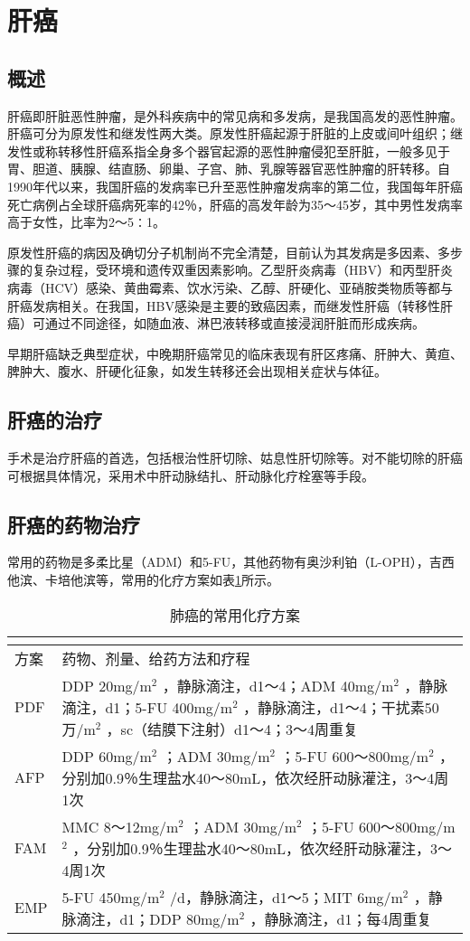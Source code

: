 \section{肝癌}

\subsection{概述}

肝癌即肝脏恶性肿瘤，是外科疾病中的常见病和多发病，是我国高发的恶性肿瘤。肝癌可分为原发性和继发性两大类。原发性肝癌起源于肝脏的上皮或间叶组织；继发性或称转移性肝癌系指全身多个器官起源的恶性肿瘤侵犯至肝脏，一般多见于胃、胆道、胰腺、结直肠、卵巢、子宫、肺、乳腺等器官恶性肿瘤的肝转移。自1990年代以来，我国肝癌的发病率已升至恶性肿瘤发病率的第二位，我国每年肝癌死亡病例占全球肝癌病死率的42％，肝癌的高发年龄为35～45岁，其中男性发病率高于女性，比率为2～5∶1。

原发性肝癌的病因及确切分子机制尚不完全清楚，目前认为其发病是多因素、多步骤的复杂过程，受环境和遗传双重因素影响。乙型肝炎病毒（HBV）和丙型肝炎病毒（HCV）感染、黄曲霉素、饮水污染、乙醇、肝硬化、亚硝胺类物质等都与肝癌发病相关。在我国，HBV感染是主要的致癌因素，而继发性肝癌（转移性肝癌）可通过不同途径，如随血液、淋巴液转移或直接浸润肝脏而形成疾病。

早期肝癌缺乏典型症状，中晚期肝癌常见的临床表现有肝区疼痛、肝肿大、黄疸、脾肿大、腹水、肝硬化征象，如发生转移还会出现相关症状与体征。

\subsection{肝癌的治疗}

手术是治疗肝癌的首选，包括根治性肝切除、姑息性肝切除等。对不能切除的肝癌可根据具体情况，采用术中肝动脉结扎、肝动脉化疗栓塞等手段。

\subsection{肝癌的药物治疗}

常用的药物是多柔比星（ADM）和5-FU，其他药物有奥沙利铂（L-OPH），吉西他滨、卡培他滨等，常用的化疗方案如表\ref{tab17-5}所示。

\begin{longtable}[]{lp{10cm}}
    \caption{肺癌的常用化疗方案}\\
    \label{tab17-5}\\
\toprule
方案 & 药物、剂量、给药方法和疗程\tabularnewline
\midrule
\endhead
PDF & DDP 20mg/m$^2$ ，静脉滴注，d1～4；ADM 40mg/m$^2$
，静脉滴注，d1；5-FU 400mg/m$^2$ ，静脉滴注，d1～4；干扰素50万/m$^2$
，sc（结膜下注射）d1～4；3～4周重复\tabularnewline
AFP & DDP 60mg/m$^2$ ；ADM 30mg/m$^2$ ；5-FU 600～800mg/m$^2$
，分别加0.9％生理盐水40～80mL，依次经肝动脉灌注，3～4周1次\tabularnewline
FAM & MMC 8～12mg/m$^2$ ；ADM 30mg/m$^2$ ；5-FU 600～800mg/m$^2$
，分别加0.9％生理盐水40～80mL，依次经肝动脉灌注，3～4周1次\tabularnewline
EMP & 5-FU 450mg/m$^2$ /d，静脉滴注，d1～5；MIT 6mg/m$^2$
，静脉滴注，d1；DDP 80mg/m$^2$ ，静脉滴注，d1；每4周重复\tabularnewline
\bottomrule
\end{longtable}